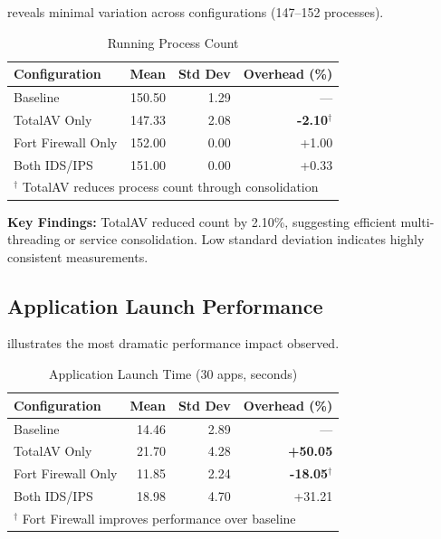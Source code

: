\documentclass[runningheads,a4paper,english]{llncs}[2022/01/12]
\begin{document}
 reveals minimal variation across configurations (147--152 processes).

\begin{table}[htbp]
\caption{Running Process Count}
\label{tab:process_count}
\centering
\small
\begin{tabular}{@{}lrrr@{}}
\toprule
\textbf{Configuration} & \textbf{Mean} & \textbf{Std Dev} & \textbf{Overhead (\%)} \\
\midrule
Baseline & 150.50 & 1.29 & --- \\
TotalAV Only & 147.33 & 2.08 & \textbf{-2.10}$^\dagger$ \\
Fort Firewall Only & 152.00 & 0.00 & +1.00 \\
Both IDS/IPS & 151.00 & 0.00 & +0.33 \\
\bottomrule
\multicolumn{4}{l}{\small $^\dagger$ TotalAV reduces process count through consolidation}
\end{tabular}
\end{table}

\textbf{Key Findings:} TotalAV reduced count by 2.10\%, suggesting efficient multi-threading or service consolidation. Low standard deviation indicates highly consistent measurements.

\subsection{Application Launch Performance}

 illustrates the most dramatic performance impact observed.

\begin{table}[htbp]
\caption{Application Launch Time (30 apps, seconds)}
\label{tab:app_launch}
\centering
\small
\begin{tabular}{@{}lrrr@{}}
\toprule
\textbf{Configuration} & \textbf{Mean} & \textbf{Std Dev} & \textbf{Overhead (\%)} \\
\midrule
Baseline & 14.46 & 2.89 & --- \\
TotalAV Only & 21.70 & 4.28 & \textbf{+50.05} \\
Fort Firewall Only & 11.85 & 2.24 & \textbf{-18.05}$^\dagger$ \\
Both IDS/IPS & 18.98 & 4.70 & +31.21 \\
\bottomrule
\multicolumn{4}{l}{\small $^\dagger$ Fort Firewall improves performance over baseline}
\end{tabular}
\end{table}
\end{document}
